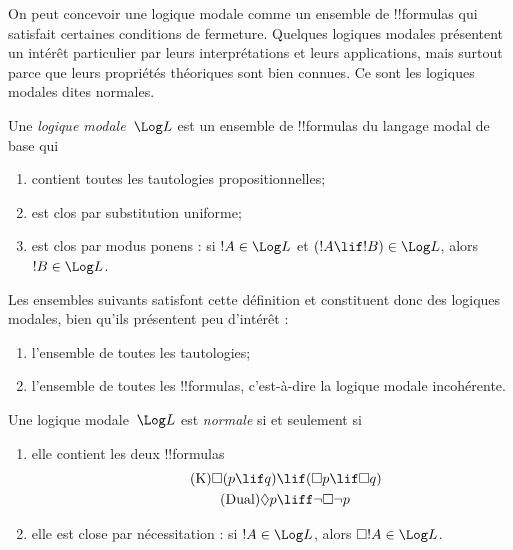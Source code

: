 \documentclass[../../../include/open-logic-section]{subfiles}
\begin{document}


On peut concevoir une logique modale comme un ensemble de !!{formula}s
qui satisfait certaines conditions de fermeture. Quelques logiques
modales présentent un intérêt particulier par leurs interprétations
et leurs applications, mais surtout parce que leurs propriétés
théoriques sont bien connues. Ce sont les logiques modales dites normales.

\begin{defn}
Une \emph{logique modale}~$\Log L$ est un ensemble de !!{formula}s
du langage modal de base qui
\begin{enumerate}
\item contient toutes les tautologies propositionnelles;
\item est clos par substitution uniforme;
\item est clos par modus ponens : si $!A \in \Log L$ et
  $(!A \lif !B) \in \Log L$, alors $!B \in \Log L$.
\end{enumerate}
\end{defn}

\begin{ex}
Les ensembles suivants satisfont cette définition et constituent
donc des logiques modales, bien qu'ils présentent peu d'intérêt :
\begin{enumerate}
\item l'ensemble de toutes les tautologies;
\item l'ensemble de toutes les !!{formula}s, c'est-à-dire la logique
  modale incohérente.
\end{enumerate}
\end{ex}

\begin{defn}\label{defn:normal-modal-logic}
Une logique modale~$\Log L$ est \emph{normale} si et seulement si
\begin{enumerate}
\item elle contient les deux !!{formula}s
\begin{align}
\tag{K} \Box(p \lif q) & \lif (\Box p \lif \Box q) \\
\tag{Dual} \Diamond p & \liff \lnot \Box \lnot p
\end{align}
\item elle est close par nécessitation : si $!A \in
  \Log L$, alors $\Box !A \in \Log L$.
\end{enumerate}
\end{defn}
\end{document}

